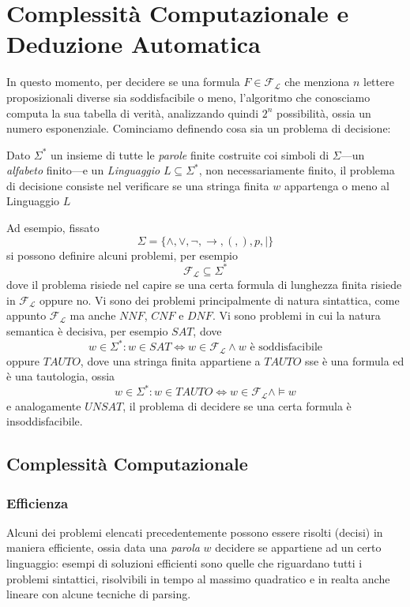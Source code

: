 \chapter{Complessità Computazionale e Deduzione Automatica}

In questo momento, per decidere se una formula $F \in \mathscr{F}_\mathscr{L}$ che menziona $n$ lettere proposizionali diverse sia soddisfacibile o meno, l'algoritmo che conosciamo computa la sua tabella di verità, analizzando quindi $2^n$ possibilità, ossia un numero esponenziale. 
Cominciamo definendo cosa sia un problema di decisione:
\begin{defi}
Dato $\Sigma^*$ un insieme di tutte le \textit{parole} finite costruite coi simboli di $\Sigma$—un \textit{alfabeto} finito—e un \textit{Linguaggio} $L \subseteq \Sigma^*$, non necessariamente finito, il problema di decisione consiste nel verificare se una stringa finita $w$ appartenga o meno al Linguaggio $L$
\end{defi}

Ad esempio, fissato 
$$
\Sigma = \{\land, \lor, \neg, \rightarrow, (, ), p, |\}
$$
si possono definire alcuni problemi, per esempio
$$
\mathscr{F}_\mathscr{L} \subseteq \Sigma ^*
$$
dove il problema risiede nel capire se una certa formula di lunghezza finita
risiede in $\mathscr{F}_\mathscr{L}$ oppure no. 
Vi sono dei problemi principalmente di natura sintattica, come appunto $\mathscr{F}_\mathscr{L}$ 
ma anche $NNF$, $CNF$ e $DNF$. Vi sono problemi in cui la natura semantica 
è decisiva, per esempio $SAT$, dove 
$$
w \in \Sigma^* : w\in SAT \iff w \in \mathscr{F}_\mathscr{L} \land w \text{ è soddisfacibile}
$$
oppure $TAUTO$, dove una stringa finita appartiene a $TAUTO$ sse è una formula ed è una tautologia, ossia
$$
w \in \Sigma^* : w \in TAUTO \iff w \in \mathscr{F}_\mathscr{L} \land \models w
$$
e analogamente $UNSAT$, il problema di decidere se una certa formula è
insoddisfacibile.

\section{Complessità Computazionale}
\subsection{Efficienza}
Alcuni dei problemi elencati precedentemente possono essere risolti (decisi) 
in maniera efficiente, ossia data una \textit{parola} $w$ decidere se 
appartiene ad un certo linguaggio: esempi di soluzioni efficienti sono 
quelle che riguardano tutti i problemi sintattici, risolvibili in tempo 
al massimo quadratico e in realta anche lineare con alcune tecniche di parsing. 

